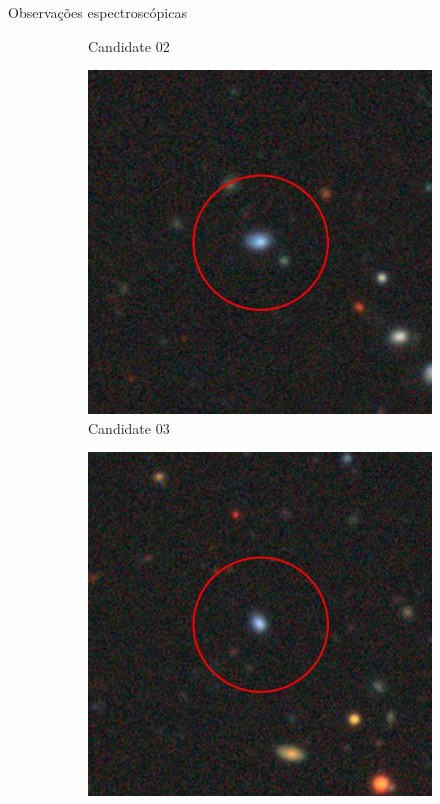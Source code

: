 \begin{frame}[c]{Observações espectroscópicas}
\begin{figure}
\begin{subfigure}[b]{0.11\textwidth}
        \caption{Candidate 02}
    \end{subfigure}
    \begin{subfigure}[b]{0.11\textwidth}
        \includegraphics[width=\textwidth]{images/proposatal_candidatas_1/UCG03.jpg}
        \caption{Candidate 03}
    \end{subfigure}
    \begin{subfigure}[b]{0.11\textwidth}
        \includegraphics[width=\textwidth]{images/proposatal_candidatas_1/UCG04.jpg}

\end{subfigure}
\end{figure}
\end{frame}
